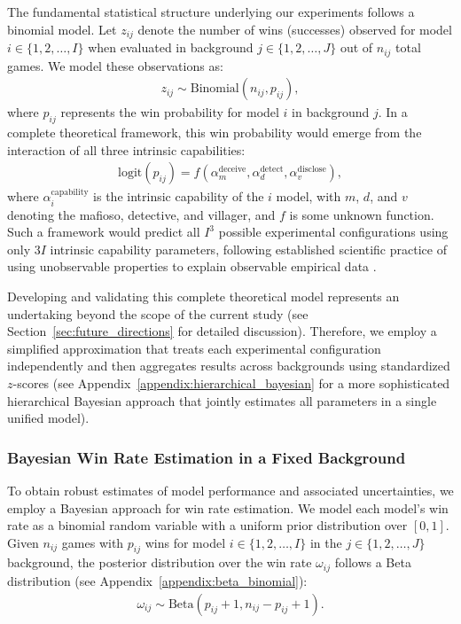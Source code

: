 \documentclass{article}
\begin{document}
The fundamental statistical structure underlying our experiments follows a binomial model. Let $z_{ij}$ denote the number of wins (successes) observed for model $i\in\{1,2,\dots,I\}$ when evaluated in background $j\in\{1,2,\dots,J\}$ out of $n_{ij}$ total games. We model these observations as:
\begin{align}
z_{ij} \sim \text{Binomial}(n_{ij}, p_{ij}),
\end{align}
where $p_{ij}$ represents the win probability for model $i$ in background $j$. In a complete theoretical framework, this win probability would emerge from the interaction of all three intrinsic capabilities:
\begin{align}
\text{logit}(p_{ij}) = f(\alpha_m^{\text{deceive}}, \alpha_d^{\text{detect}}, \alpha_v^{\text{disclose}}),
\end{align}
where $\alpha_i^{\text{capability}}$ is the intrinsic capability of the $i$ model, with $m$, $d$, and $v$ denoting the mafioso, detective, and villager, and $f$ is some unknown function. Such a framework would predict all $I^3$ possible experimental configurations using only $3I$ intrinsic capability parameters, following established scientific practice of using unobservable properties to explain observable empirical data \citep{bunge1973philosophy,costa2021benefitsmarriagesearchstrategy}.

Developing and validating this complete theoretical model represents an undertaking beyond the scope of the current study (see Section~\ref{sec:future_directions} for detailed discussion). Therefore, we employ a simplified approximation that treats each experimental configuration independently and then aggregates results across backgrounds using standardized $z$-scores (see Appendix~\ref{appendix:hierarchical_bayesian} for a more sophisticated hierarchical Bayesian approach that jointly estimates all parameters in a single unified model).


\subsubsection{Bayesian Win Rate Estimation in a Fixed Background}

To obtain robust estimates of model performance and associated uncertainties, we employ a Bayesian approach for win rate estimation. We model each model's win rate as a binomial random variable with a uniform prior distribution over $[0,1]$. Given $n_{ij}$ games with $p_{ij}$ wins for model $i\in\{1,2,\dots,I\}$ in the $j\in\{1,2,\dots,J\}$ background, the posterior distribution over the win rate $\omega_{ij}$ follows a Beta distribution (see Appendix~\ref{appendix:beta_binomial}):
\begin{align}
\omega_{ij}\sim \text{Beta}(p_{ij} + 1, n_{ij} - p_{ij} + 1).
\end{align}
\end{document}

